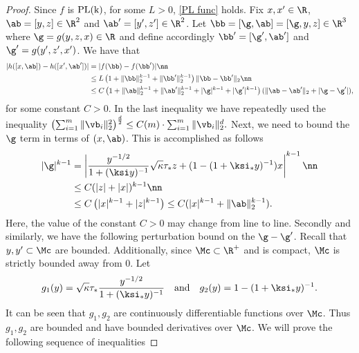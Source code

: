 \begin{proof}
Since $f$ is $\rm{PL}(k)$, for some $L>0$, \eqref{PL func} holds. Fix $x,x'\in\R$, $\ab=[y,z]\in\R^{2}$ and $\ab'=[y',z']\in\R^{2}$. Let $\bb=[\g,\ab]=[\g,y,z]\in\R^3$ where $\g=g(y,z,x)\in\R$ and define accordingly $\bb'=[\g',\ab']$ and $\g'=g(y',z',x')$. We have that
\begin{align}
|h([x,\ab])-h([x',\ab'])|&= |f(\bb)-f(\bb')|\nn\\
&\leq L\left(1+\|\bb\|_2^{k-1}+\|\bb'\|_2^{k-1}\right)\|\bb-\bb'\|_2\nn\\
&\leq C\left(1+\|\ab\|_2^{k-1}+\|\ab'\|_2^{k-1}+|\g|^{k-1}+|\g'|^{k-1}\right)(\|\ab-\ab'\|_2+|\g-\g'|),\label{eq:hlip}
\end{align}
for some constant $C>0$. In the last inequality we have repeatedly used the inequality
$
\left(\sum_{i=1}^m \|\vb_i\|_2^2\right)^{\frac{d}{2}} \leq  C(m)\cdot\sum_{i=1}^m\|\vb_i\|_2^{d}.
$
Next, we need to bound the $\g$ term in terms of $(x,\ab)$. This is accomplished as follows
\begin{align}
|\g|^{k-1} &= \left|\frac{y^{-1/2}}{1+(\ksi y)^{-1}}\sqrt{\kappa}\tau_* z + (1-(1+\ksi_*y)^{-1})x\right|^{k-1}\nn\\
&\leq C (|z|+|x|)^{k-1} \nn\\
&\leq C \left(|x|^{k-1}+|z|^{k-1}\right) \leq C (|x|^{k-1} + \|\ab\|_2^{k-1}).\label{eq:gb}
\end{align}
Here, the value of the constant $C>0$ may change from line to line. 
Secondly and similarly, we have the following perturbation bound on the $\g-\g'$. Recall that $y,y'\subset \Mc$ are bounded. Additionally, since $\Mc\subset\R^+$ and is compact, $\Mc$ is strictly bounded away from $0$. Let 
\[
g_1(y)=\sqrt{\kappa}\tau_*\frac{y^{-1/2}}{1+(\ksi_* y)^{-1}}\quad\text{and}\quad g_2(y)=1-(1+\ksi_*y)^{-1}.
\]
It can be seen that $g_1,g_2$ are continuously differentiable functions over $\Mc$. Thus $g_1,g_2$ are bounded and have bounded derivatives over $\Mc$. We will prove the following sequence of inequalities

\end{proof}
